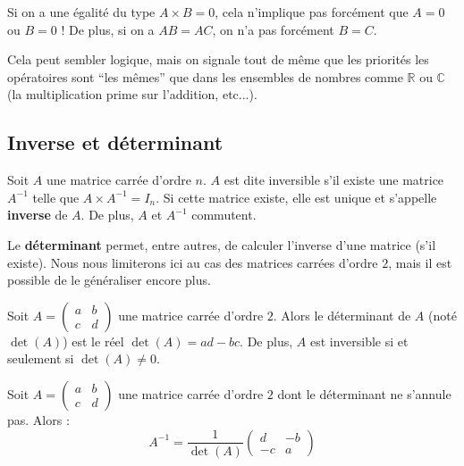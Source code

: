 	\begin{tip}[Attention !]
		Si on a une égalité du type $A \times B = 0$, cela n'implique pas forcément que $A = 0$ ou $B = 0$ !
		\newpar
		De plus, si on a $AB = AC$, on n'a pas forcément $B = C$.
	\end{tip}

	Cela peut sembler logique, mais on signale tout de même que les priorités les opératoires sont ``les mêmes'' que dans les ensembles de nombres comme $\mathbb{R}$ ou $\mathbb{C}$ (la multiplication prime sur l'addition, etc...).

	\subsection{Inverse et déterminant}

	\begin{formula}
		Soit $A$ une matrice carrée d'ordre $n$. $A$ est dite inversible s'il existe une matrice $A^{-1}$ telle que $A \times A^{-1} = I_n$.
		\newpar
		Si cette matrice existe, elle est unique et s'appelle \textbf{inverse} de $A$. De plus, $A$ et $A^{-1}$ commutent.
	\end{formula}

	Le \textbf{déterminant} permet, entre autres, de calculer l'inverse d'une matrice (s'il existe). Nous nous limiterons ici au cas des matrices carrées d'ordre $2$, mais il est possible de le généraliser encore plus.

	\begin{formula}
		Soit $A = \begin{pmatrix} a & b \\ c & d \end{pmatrix}$ une matrice carrée d'ordre $2$.
		\newpar
		Alors le déterminant de $A$ (noté $\det(A)$) est le réel $\det(A) = ad - bc$. De plus, $A$ est inversible si et seulement si $\det(A) \neq 0$.
	\end{formula}

	\begin{formula}
		Soit $A = \begin{pmatrix} a & b \\ c & d \end{pmatrix}$ une matrice carrée d'ordre $2$ dont le déterminant ne s'annule pas. Alors :
		\[ A^{-1} = \frac{1}{\det(A)} \begin{pmatrix} d & -b \\ -c & a \end{pmatrix} \]
	\end{formula}

